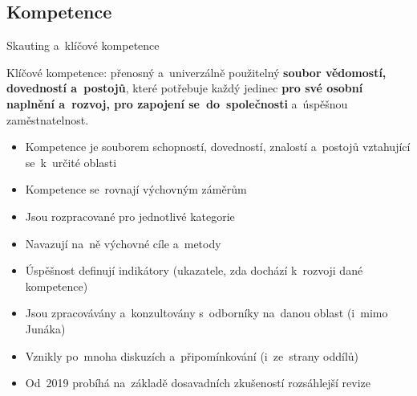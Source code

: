 \documentclass[compress, ucs, xelatex, 11pt, xcolor=dvipsnames, print, aspectratio=169,
	hyperref={
		bookmarks=true,
		unicode=true,
		colorlinks=true,
		pdftitle={Skautska vychovna metoda},
		plainpages=false,
		pdfauthor={Vojtech Zeisek},
		pdfsubject={Skautska vychovna metoda a jeji vyvoj za posledni stoleti a desetileti},
		pdfcreator={XeLaTeX},
		pdfkeywords={Junak, Pedagogika, Skaut, Skauting, Vychovna metoda},
		linkcolor=Red, %
		anchorcolor=ForestGreen, %
		citecolor=ForestGreen, %
		filecolor=ForestGreen, %
		menucolor=ForestGreen, %
		urlcolor=Sepia, %
		pdftex},
	url={hyphens, lowtilde} %
	]{beamer}
\begin{document}
\subsection{Kompetence}

\begin{frame}{Skauting a~klíčové kompetence}
	\begin{center}
		Klíčové kompetence: přenosný a~univerzálně použitelný \textbf{soubor vědomostí, dovedností a~postojů}, které potřebuje každý jedinec \textbf{pro své osobní naplnění a~rozvoj, pro zapojení se~do~společnosti} a~úspěšnou zaměstnatelnost.
	\end{center}
	\begin{itemize}
		\item Kompetence je souborem schopností, dovedností, znalostí a~postojů vztahující se~k~určité oblasti
		\item Kompetence se~rovnají výchovným záměrům
		\item Jsou rozpracované pro jednotlivé kategorie
		\item Navazují na~ně výchovné cíle a~metody
		\item Úspěšnost definují indikátory (ukazatele, zda dochází k~rozvoji dané kompetence)
		\item Jsou zpracovávány a~konzultovány s~odborníky na~danou oblast (i~mimo Junáka)
		\item Vznikly po~mnoha diskuzích a~připomínkování (i~ze~strany oddílů)
		\item Od~2019 probíhá na~základě dosavadních zkušeností rozsáhlejší revize
	\end{itemize}
\end{frame}
\end{document}

